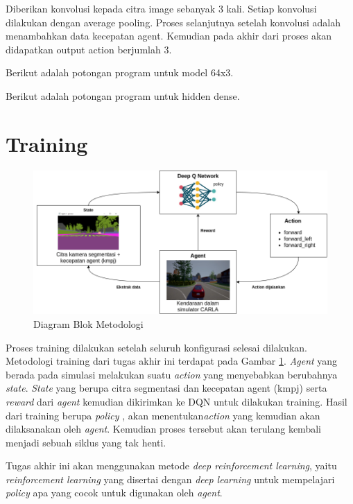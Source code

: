 Diberikan konvolusi kepada citra image sebanyak 3 kali. Setiap konvolusi dilakukan dengan average pooling. Proses selanjutnya setelah konvolusi adalah menambahkan data kecepatan agent. Kemudian pada akhir dari proses akan didapatkan output action berjumlah 3.

Berikut adalah potongan program untuk model 64x3.


Berikut adalah potongan program untuk hidden dense.



\section{Training}
\label{sec:training}

\begin{figure}[H] 
	\centering
	\includegraphics[width=1\linewidth]{images/metodologi}
	\caption{Diagram Blok Metodologi}
	\label{fig:blockdiagram}
\end{figure}

Proses training dilakukan setelah seluruh konfigurasi selesai dilakukan. Metodologi training dari tugas akhir ini terdapat pada Gambar \ref{fig:blockdiagram}. \textit{Agent} yang berada pada simulasi melakukan suatu \textit{action} yang menyebabkan berubahnya \textit{state}. \textit{State} yang berupa citra segmentasi dan kecepatan agent (kmpj) serta \textit{reward }dari \textit{agent} kemudian dikirimkan ke DQN untuk dilakukan training. Hasil dari training berupa \textit{policy },  akan menentukan\textit{action} yang kemudian akan dilaksanakan oleh \textit{agent}. Kemudian proses tersebut akan terulang kembali menjadi sebuah siklus yang tak henti.

\iffalse
Tugas akhir ini akan menggunakan metode \textit{deep reinforcement learning}, yaitu \textit{reinforcement learning }yang disertai dengan \textit{deep learning }untuk mempelajari \textit{policy }apa yang cocok untuk digunakan oleh \textit{agent}. 

